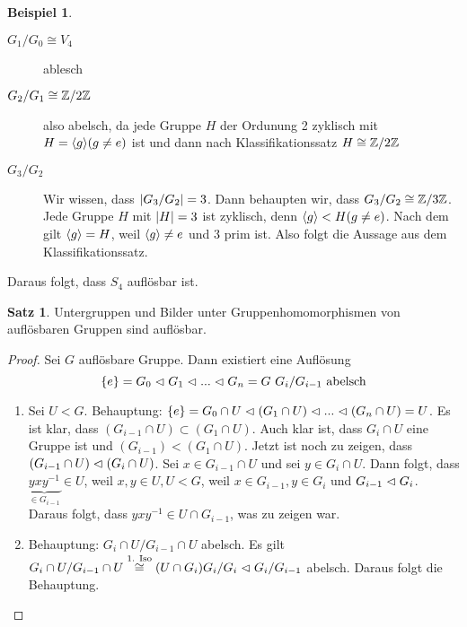 \documentclass[12pt,a4paper]{article}
\newcounter{thmcounter}[subsection]
\theoremstyle{definition}
\theoremstyle{remark}
\theoremstyle{definition}
\newtheorem{satz}[thmcounter]{Satz}
\theoremstyle{definition}
\newtheorem*{bsp}{Beispiel}
\theoremstyle{plain}
\theoremstyle{plain}
\DeclarePairedDelimiter{\abs}{\lvert}{\rvert}
\begin{document}
\begin{bsp}
\begin{enumerate}
\begin{description}
			\item[$G_1/G_0 \cong V_4$] ablesch
			\item[$G_2/G_1 \cong \mathbb Z/2\mathbb Z$] also abelsch, da jede Gruppe $H$ der Ordunung 2 zyklisch mit $H = \langle g\rangle (g \neq e)$ ist und dann nach Klassifikationssatz $H \cong \mathbb Z/2\mathbb Z$
			\item[$G_3/G_2$] Wir wissen, dass $\abs{G_3/G_2} = 3$. Dann behaupten wir, dass $G_3/G_2 \cong \mathbb Z/3\mathbb Z$. Jede Gruppe $H$ mit $\abs H = 3$ ist zyklisch, denn $\langle g\rangle < H (g \neq e)$. Nach dem  gilt $\langle g\rangle = H$, weil $\langle g\rangle \neq e$ und 3 prim ist. Also folgt die Aussage aus dem Klassifikationssatz.
		\end{description}
		Daraus folgt, dass $S_4$ auflösbar ist.
	\end{enumerate}

	\begin{satz}
		Untergruppen und Bilder unter Gruppenhomomorphismen von auflösbaren Gruppen sind auflösbar.
	\end{satz}
	\begin{proof}
		Sei $G$ auflösbare Gruppe. Dann existiert eine Auflösung 
		\begin{equation*}
			\left\lbrace e\right\rbrace = G_0 \vartriangleleft G_1 \vartriangleleft ... \vartriangleleft G_n = G ~ G_i/G_{i-1} \text{ abelsch}
		\end{equation*}
		\begin{enumerate}
			\item Sei $U < G$. Behauptung: $\left\lbrace e\right\rbrace = G_0 \cap U \vartriangleleft (G_1 \cap U) \vartriangleleft ... \vartriangleleft (G_n \cap U) = U $. Es ist klar, dass $(G_{i-1} \cap U) \subset (G_1 \cap U)$. Auch klar ist, dass $G_i \cap U$ eine Gruppe ist und $(G_{i-1} ) < (G_1 \cap U)$. Jetzt ist noch zu zeigen, dass $(G_{i-1} \cap U) \vartriangleleft (G_i \cap U)$. Sei $x \in G_{i-1} \cap U$ und sei $y \in G_i \cap U$. Dann folgt, dass $\underbrace{yxy^{-1}}_{\in G_{i-1}} \in U$, weil $x, y \in U, U < G$, weil $x \in G_{i-1}, y \in G_i$ und $G_{i-1} \vartriangleleft G_i$. Daraus folgt, dass $yxy^{-1} \in U \cap G_{i-1}$, was zu zeigen war.
			\item Behauptung: $G_i \cap U / G_{i-1} \cap U$ abelsch. Es gilt $G_i \cap U / G_{i-1} \cap U \stackrel{\text{1. Iso}}{\cong} (U \cap G_i)G_i/G_i \vartriangleleft G_i/G_{i-1}$ abelsch. Daraus folgt die Behauptung.
		\end{enumerate}
	\end{proof}
\end{bsp}


\end{document}

